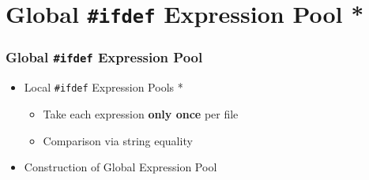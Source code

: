 \documentclass{beamer}
\newcommand\code[1]{\texttt{#1}}
\newcommand\ifdeff[1]{\code{\##1}\xspace}
\newcommand\ifdef[0]{{\upshape\ifdeff{ifdef}}\xspace}
\begin{document}
\section[Global Pool *]{Global \ifdef Expression Pool *}


\begin{frame}
\frametitle{Global \ifdef Expression Pool}

\begin{itemize}

\item Local \ifdef Expression Pools \textcolor{colorPassauAlert}{*}
	\begin{itemize}
	\item Take each expression \textbf{only once} per file
	\item Comparison via string equality
	\end{itemize}

\item Construction of Global Expression Pool

\end{itemize}

\end{frame}
\end{document}
